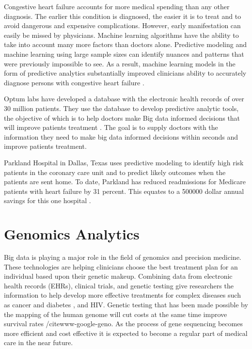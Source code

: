 \documentclass[sigconf]{acmart}
\begin{document}
{{Congestive heart failure accounts for more medical spending than any other diagnosis. The earlier this condition is diagnosed, the easier it is to treat and to avoid dangerous and expensive complications.  However, early manifestation can easily be missed by physicians. Machine learning algorithms have the ability to take into account many more factors than doctors alone. Predictive modeling and machine learning using large sample sizes can identify nuances and patterns that were previously impossible to see.  As a result, machine learning models in the form of predictive analytics substantially improved clinicians ability to accurately diagnose persons with congestive heart failure \cite{www-google-datapine}. 

Optum labs have developed a database with the electronic health records of over 30 million patients. They use the database to develop predictive analytic tools, the objective of which is to help doctors make Big data informed decisions that will improve patients treatment \cite{www-google-McDonald}.  The goal is to supply doctors with the information they need to make big data informed decisions within seconds and improve patients treatment. 

Parkland Hospital in Dallas, Texas uses predictive modeling to identify high risk patients in the coronary care unit and to predict likely outcomes when the patients are sent home. To date, Parkland has reduced readmissions for Medicare patients with heart failure by 31 percent. This equates to a 500000 dollar annual savings for this one hospital \cite{www-google-datafloq}. 
  
\section{Genomics Analytics}
Big data is playing a major role in the field of genomics and precision medicine. These technologies are helping clinicians choose the best treatment plan for an individual based upon their genetic makeup. Combining data from electronic health records (EHRs), clinical trials, and genetic testing give researchers the information to help develop more effective treatments for complex diseases such as cancer and diabetes \cite{www-google-pacient}, and HIV.  Genetic testing that has been made possible by the mapping of the human genome will cut costs at the same time improve survival rates /cite{www-google-geno}. As the process of gene sequencing becomes more efficient and cost effective it is expected to become a regular part of medical care in the near future.

}}
\end{document}
